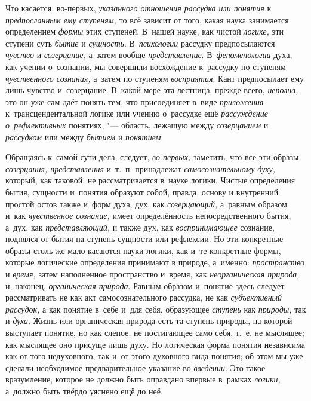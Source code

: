 Что касается, во-первых, {\em указанного отношения рассудка или понятия}
к {\em предпосланным ему ступеням,} то всё зависит от того, какая наука
занимается определением {\em формы} этих ступеней. В~нашей науке, как
чистой {\em логике,} эти ступени суть {\em бытие} и {\em сущность}.
В~{\em психологии} рассудку предпосылаются {\em чувство} и
{\em созерцание,} а~затем вообще {\em представление}. В~{\em феноменологии}
духа, как учении о~сознании, мы совершили восхождение к~рассудку по
ступеням {\em чувственного сознания,} а~затем по ступеням
{\em восприятия}. Кант предпосылает ему лишь чувство и~созерцание. В~какой
мере эта лестница, прежде всего, {\em неполна,} это он уже сам даёт
понять тем, что присоединяет в~виде {\em приложения} к~трансцендентальной
логике или учению о~рассудке ещё {\em рассуждение о~рефлективных}
понятиях, "--- область, лежащую между {\em созерцанием} и {\em рассудком}
или между {\em бытием} и {\em понятием}.

Обращаясь к~самой сути дела, следует, {\em во-первых,}
заметить, что все эти образы {\em созерцания, представления}
и~т.~п. принадлежат {\em самосознательному духу,}
который, как таковой, не рассматривается в~науке логики.
Чистые определения бытия, сущности и~понятия образуют собой, правда, основу
и внутренний простой остов также и~форм духа; дух, как
{\em созерцающий,} а~равным образом и~как {\em чувственное сознание,}
имеет определённость непосредственного бытия, а~дух, как {\em представляющий,}
и также дух, как {\em воспринимающее}
сознание, поднялся от бытия на ступень сущности или
рефлексии. Но эти конкретные образы столь же мало касаются науки логики,
как и~те конкретные формы, которые логические определения принимают в
природе, а~именно: {\em пространство} и {\em время,}
затем наполненное пространство и~время, как
{\em неорганическая природа,} и, наконец, {\em органическая природа}.
Равным образом и~понятие здесь следует рассматривать не как
акт самосознательного рассудка, не как {\em субъективный рассудок,}
а как понятие в~себе и~для себя, образующее {\em ступень} как
{\em природы,} так и {\em духа}. Жизнь или
органическая природа есть та ступень природы, на которой выступает понятие,
но как слепое, не постигающее само себя, т.~е. не мыслящее; как мыслящее
оно присуще лишь духу. Но логическая форма понятия независима как от того
недуховного, так и~от этого духовного вида понятия; об этом мы уже сделали
необходимое предварительное указание во {\em введении}. Это такое
вразумление, которое не должно быть оправдано впервые в~рамках
{\em логики,} а~должно быть твёрдо уяснено ещё до неё.

